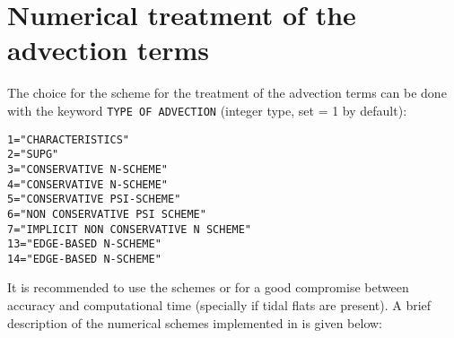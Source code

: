 \section{Numerical treatment of the advection terms}
The choice for the scheme for the treatment of the advection terms can be done with the keyword \texttt{TYPE OF ADVECTION} (integer type, set {\ttfamily = 1} by default):
\begin{lstlisting}[frame=trBL]  
1="CHARACTERISTICS" 
2="SUPG" 
3="CONSERVATIVE N-SCHEME"
4="CONSERVATIVE N-SCHEME"
5="CONSERVATIVE PSI-SCHEME"
6="NON CONSERVATIVE PSI SCHEME"
7="IMPLICIT NON CONSERVATIVE N SCHEME"
13="EDGE-BASED N-SCHEME"
14="EDGE-BASED N-SCHEME"
\end{lstlisting}
It is recommended to use the schemes {} or {} for a good compromise between accuracy and computational time (specially if tidal flats are present). A brief description of the numerical schemes implemented in \sisyphe{} is given below:
